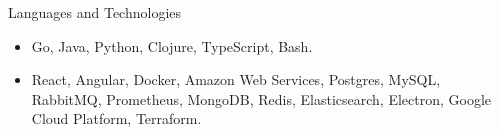 \documentclass[]{cv}
\begin{document}
	\begin{cvsection}{Languages and Technologies}
		\begin{cvsubsection}{}{}{}	
			\begin{itemize}
				\item Go, Java, Python, Clojure, TypeScript, Bash. 
				\item React, Angular, Docker, Amazon Web Services, Postgres, MySQL, RabbitMQ, Prometheus, MongoDB, Redis, Elasticsearch, Electron, Google Cloud Platform, Terraform.
			\end{itemize}
		\end{cvsubsection}
	\end{cvsection}
	
\end{document}
